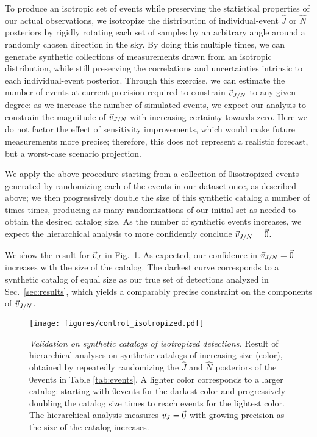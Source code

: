 \documentclass[aps,prd,twocolumn,superscriptaddress,preprintnumbers,floatfix,nofootinbib]{revtex4-2}
\newcommand{\Nevents}{0}
\newcommand{\Niteriso}{}
\newcommand{\Nmaxiso}{}
\begin{document}
To produce an isotropic set of events while preserving the statistical properties of our actual observations, we isotropize the distribution of individual-event $\hat{J}$ or $\hat{N}$ posteriors by rigidly rotating each set of samples by an arbitrary angle around a randomly chosen direction in the sky.
By doing this multiple times, we can generate synthetic collections of measurements drawn from an isotropic distribution, while still preserving the correlations and uncertainties intrinsic to each individual-event posterior.
Through this exercise, we can estimate the number of events at current precision required to constrain $\vec{v}_{J/N}$ to any given degree: as we increase the number of simulated events, we expect our analysis to constrain the magnitude of $\vec{v}_{J/N}$ with increasing certainty towards zero.
Here we do not factor the effect of sensitivity improvements, which would make future measurements more precise; therefore, this does not represent a realistic forecast, but a worst-case scenario projection.

We apply the above procedure starting from a collection of \Nevents isotropized events generated by randomizing each of the events in our dataset once, as described above; we then progressively double the size of this synthetic catalog a number of times times, producing as many randomizations of our initial set as needed to obtain the desired catalog size.
As the number of synthetic events increases, we expect the hierarchical analysis to more confidently conclude $\vec{v}_{J/N} = \vec{0}$.

We show the result for $\vec{v}_{J}$ in Fig.~\ref{fig:control-iso}.
As expected, our confidence in $\vec{v}_{J/N} = \vec{0}$ increases with the size of the catalog.
The darkest curve corresponds to a synthetic catalog of equal size as our true set of detections analyzed in Sec.~\ref{sec:results}, which yields a comparably precise constraint on the components of $\vec{v}_{J/N}$.

\begin{figure}
\texttt{[image: figures/control\_isotropized.pdf]}
\caption{\emph{Validation on synthetic catalogs of isotropized detections.}
Result of hierarchical analyses on synthetic catalogs of increasing size (color), obtained by repeatedly randomizing the $\hat{J}$ and $\hat{N}$ posteriors of the \Nevents events in Table \ref{tab:events}.
A lighter color corresponds to a larger catalog: starting with \Nevents events for the darkest color and progressively doubling the catalog size \Niteriso times to reach \Nmaxiso events for the lightest color.
The hierarchical analysis measures $\vec{v}_{J} = \vec{0}$ with growing precision as the size of the catalog increases.
}
\label{fig:control-iso}
\end{figure}
\end{document}
